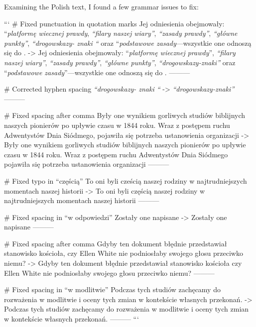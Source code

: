Examining the Polish text, I found a few grammar issues to fix:

```
# Fixed punctuation in quotation marks
Jej odniesienia obejmowały: “\textit{platformę wiecznej prawdy}, \textit{“filary naszej wiary”}, \textit{“zasady prawdy”}, \textit{“główne punkty”}, \textit{“drogowskazy- znaki “} oraz “\textit{podstawowe zasady}—wszystkie one odnoszą się do .
->
Jej odniesienia obejmowały: “\textit{platformę wiecznej prawdy}”, \textit{“filary naszej wiary”}, \textit{“zasady prawdy”}, \textit{“główne punkty”}, \textit{“drogowskazy-znaki”} oraz “\textit{podstawowe zasady}”—wszystkie one odnoszą się do .
---------

# Corrected hyphen spacing
\textit{“drogowskazy- znaki “}
->
\textit{“drogowskazy-znaki”}
---------

# Fixed spacing after comma
Były one wynikiem gorliwych studiów biblijnych naszych pionierów po upływie czasu w 1844 roku. Wraz z postępem ruchu Adwentystów Dnia Siódmego, pojawiła się potrzeba ustanowienia organizacji
->
Były one wynikiem gorliwych studiów biblijnych naszych pionierów po upływie czasu w 1844 roku. Wraz z postępem ruchu Adwentystów Dnia Siódmego pojawiła się potrzeba ustanowienia organizacji
---------

# Fixed typo in “częścią”
To oni byli cześcią naszej rodziny w najtrudniejszych momentach naszej historii
->
To oni byli częścią naszej rodziny w najtrudniejszych momentach naszej historii
---------

# Fixed spacing in “w odpowiedzi”
Zostały one napisane 
->
Zostały one napisane 
---------

# Fixed spacing after comma
Gdyby ten dokument błędnie przedstawiał stanowisko kościoła, czy Ellen White nie podniosłaby swojego głosu przeciwko niemu?
->
Gdyby ten dokument błędnie przedstawiał stanowisko kościoła czy Ellen White nie podniosłaby swojego głosu przeciwko niemu?
---------

# Fixed spacing in “w modlitwie”
Podczas tych studiów zachęcamy do rozważenia w  modlitwie i oceny tych zmian w kontekście własnych przekonań.
->
Podczas tych studiów zachęcamy do rozważenia w modlitwie i oceny tych zmian w kontekście własnych przekonań.
---------
```